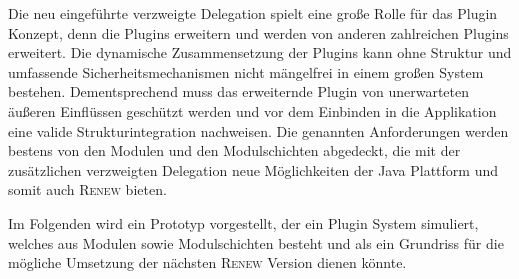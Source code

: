 	Die neu eingeführte verzweigte Delegation spielt eine große Rolle für das Plugin Konzept, denn die Plugins erweitern und werden von anderen zahlreichen Plugins erweitert. Die dynamische Zusammensetzung der Plugins kann ohne Struktur und umfassende Sicherheitsmechanismen nicht mängelfrei in einem großen System bestehen. Dementsprechend muss das erweiternde Plugin von unerwarteten äußeren Einflüssen geschützt werden und vor dem Einbinden in die Applikation eine valide Strukturintegration nachweisen. Die genannten Anforderungen werden bestens von den Modulen und den Modulschichten abgedeckt, die mit der zusätzlichen verzweigten Delegation neue Möglichkeiten der Java Plattform  und somit auch \textsc{Renew} bieten.\bigbreak

	Im Folgenden wird ein Prototyp vorgestellt, der ein Plugin System simuliert, welches aus Modulen sowie  Modulschichten besteht und als ein Grundriss für die mögliche Umsetzung der nächsten \textsc{Renew} Version dienen könnte. \bigbreak
			
